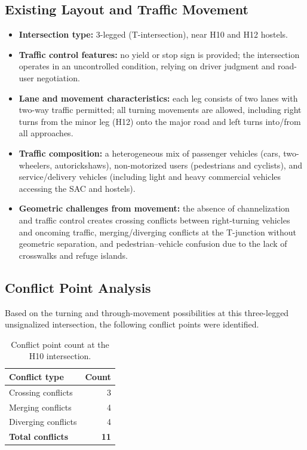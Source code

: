 \documentclass[11pt]{article}
\begin{document}
\subsection{Existing Layout and Traffic Movement}
\begin{itemize}
  \item \textbf{Intersection type:} 3-legged (T-intersection), near H10 and H12 hostels.
  \item \textbf{Traffic control features:} no yield or stop sign is provided; the intersection operates
  in an uncontrolled condition, relying on driver judgment and road-user negotiation.
  \item \textbf{Lane and movement characteristics:} each leg consists of two lanes with two-way traffic
  permitted; all turning movements are allowed, including right turns from the minor leg (H12) onto the
  major road and left turns into/from all approaches.
  \item \textbf{Traffic composition:} a heterogeneous mix of passenger vehicles (cars, two-wheelers,
  autorickshaws), non-motorized users (pedestrians and cyclists), and service/delivery vehicles
  (including light and heavy commercial vehicles accessing the SAC and hostels).
  \item \textbf{Geometric challenges from movement:} the absence of channelization and traffic control
  creates crossing conflicts between right-turning vehicles and oncoming traffic, merging/diverging
  conflicts at the T-junction without geometric separation, and pedestrian--vehicle confusion due to the
  lack of crosswalks and refuge islands.
\end{itemize}

\subsection{Conflict Point Analysis}
Based on the turning and through-movement possibilities at this three-legged unsignalized intersection,
the following conflict points were identified.

\begin{table}[H]
  \centering
  \caption{Conflict point count at the H10 intersection.}
  \begin{tabular}{@{}lr@{}}
    \toprule
    \textbf{Conflict type} & \textbf{Count} \\
    \midrule
    Crossing conflicts  & 3 \\
    Merging conflicts   & 4 \\
    Diverging conflicts & 4 \\
    \textbf{Total conflicts} & \textbf{11} \\
    \bottomrule
  \end{tabular}
\end{table}
\end{document}
